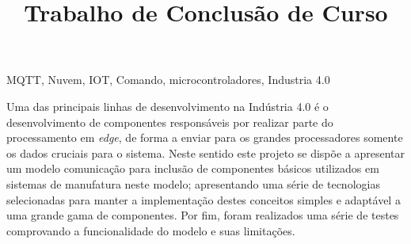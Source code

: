 \documentclass[dissertgrad]{tcc}
\title{Trabalho de Conclusão de Curso}
\begin{document}
\pretextual

\maketitle






\begin{resumo}{MQTT, Nuvem, IOT, Comando, microcontroladores, Industria 4.0}

    Uma das principais linhas de desenvolvimento na Indústria 4.0 é o desenvolvimento de componentes responsáveis por 
    realizar parte do processamento em \textit{edge}, de forma a enviar para os grandes processadores somente os dados
    cruciais para o sistema. Neste sentido este projeto se dispõe a apresentar um modelo comunicação para inclusão de
    componentes básicos utilizados em sistemas de manufatura neste modelo; apresentando uma série de tecnologias 
    selecionadas para manter a implementação destes conceitos simples e adaptável a uma grande gama de componentes.
    Por fim, foram realizados uma série de testes comprovando a funcionalidade do modelo e suas limitações.   

\end{resumo}
\end{document}
